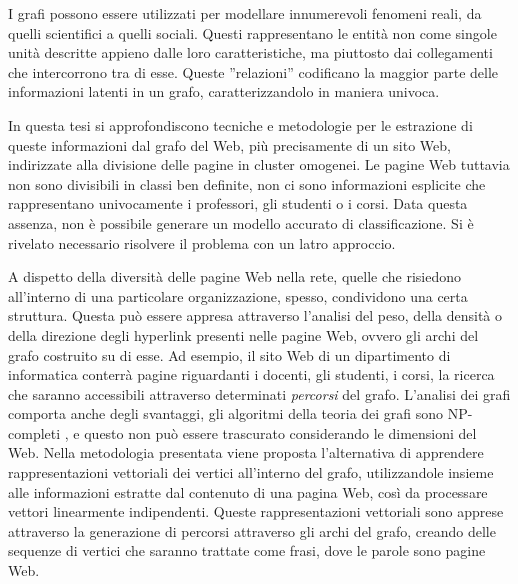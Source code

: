 

I grafi possono essere utilizzati per modellare innumerevoli fenomeni reali, da quelli scientifici a quelli sociali. Questi rappresentano le entità non come singole unità descritte appieno dalle loro caratteristiche, ma piuttosto dai collegamenti che intercorrono tra di esse. Queste ''relazioni'' codificano la maggior parte delle informazioni latenti in un grafo, caratterizzandolo in maniera univoca.

In questa tesi si approfondiscono tecniche e metodologie per le estrazione di queste informazioni dal grafo del Web, più precisamente di un sito Web, indirizzate alla divisione delle pagine in cluster omogenei. Le pagine Web tuttavia non sono divisibili in classi ben definite, non ci sono informazioni esplicite che rappresentano univocamente i professori, gli studenti o i corsi. Data questa assenza, non è possibile generare un modello accurato di classificazione. Si è rivelato necessario risolvere il problema con un latro approccio.

A dispetto della diversità delle pagine Web nella rete, quelle che risiedono all'interno di una particolare organizzazione, spesso, condividono una certa struttura. Questa può essere appresa attraverso l'analisi del peso, della densità o della direzione degli hyperlink presenti nelle pagine Web, ovvero gli archi del grafo costruito su di esse. Ad esempio, il sito Web di un dipartimento di informatica conterrà pagine riguardanti i docenti, gli studenti, i corsi, la ricerca che saranno accessibili attraverso determinati \textit{percorsi} del grafo. L'analisi dei grafi comporta anche degli svantaggi, gli algoritmi della teoria dei grafi sono NP-completi \cite{Garey}, e questo non può essere trascurato considerando le dimensioni del Web. Nella metodologia presentata viene proposta l'alternativa di apprendere rappresentazioni vettoriali dei vertici all'interno del grafo, utilizzandole insieme alle informazioni estratte dal contenuto di una pagina Web, così da processare vettori linearmente indipendenti. Queste rappresentazioni vettoriali sono apprese attraverso la generazione di percorsi attraverso gli archi del grafo, creando delle sequenze di vertici che saranno trattate come frasi, dove le parole sono pagine Web. 


